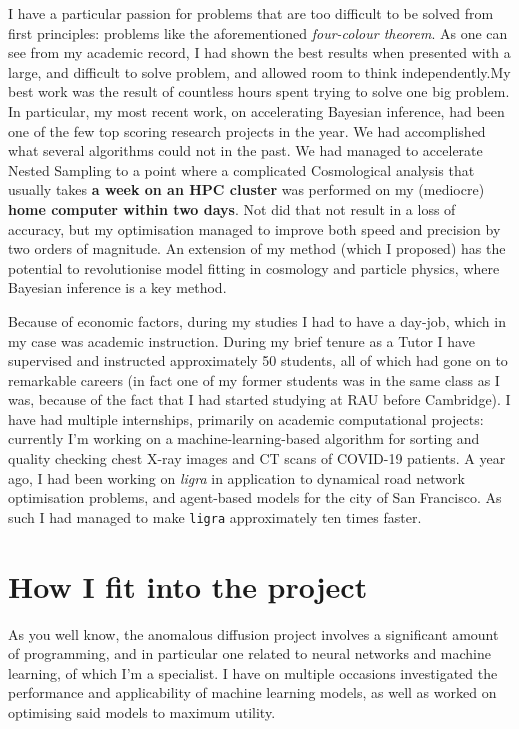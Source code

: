 \documentclass[a4paper, twocolumn]{article}
\begin{document}
I have a particular passion for problems that are too difficult to
be solved from first principles: problems like the aforementioned
\emph{four-colour theorem}. As one can see from my academic record, I had
shown the best results when presented with a large, and difficult to
solve problem, and allowed room to think independently.My best work
was the result of countless hours spent trying to solve one big
problem. In particular, my most recent work, on accelerating
Bayesian inference, had been one of the few top scoring research
projects in the year. We had accomplished what several algorithms
could not in the past. We had managed to accelerate Nested Sampling
to a point where a complicated Cosmological analysis that usually
takes \textbf{a week on an HPC cluster} was performed on my (mediocre)
\textbf{home computer within two days}. Not did that not result in a loss
of accuracy, but my optimisation managed to improve both speed and
precision by two orders of magnitude.  An extension of my method
(which I proposed) has the potential to revolutionise model fitting
in cosmology and particle physics, where Bayesian inference is a key
method.

Because of economic factors, during my studies I had to have a
day-job, which in my case was academic instruction. During my brief
tenure as a Tutor I have supervised and instructed approximately 50
students, all of which had gone on to remarkable careers (in fact
one of my former students was in the same class as I was, because of
the fact that I had started studying at RAU before Cambridge). I
have had multiple internships, primarily on academic computational
projects: currently I'm working on a machine-learning-based
algorithm for sorting and quality checking chest X-ray images and CT
scans of COVID-19 patients. A year ago, I had been working on
\emph{ligra} in application to dynamical road network optimisation
problems, and agent-based models for the city of San Francisco. As
such I had managed to make \texttt{ligra} approximately ten times faster. 

\section{How I fit into the project}
\label{sec:org695b4b7}

As you well know, the anomalous diffusion project involves a
significant amount of programming, and in particular one related to
neural networks and machine learning, of which I'm a specialist. I
have on multiple occasions investigated the performance and
applicability of machine learning models, as well as worked on
optimising said models to maximum utility.
\end{document}
